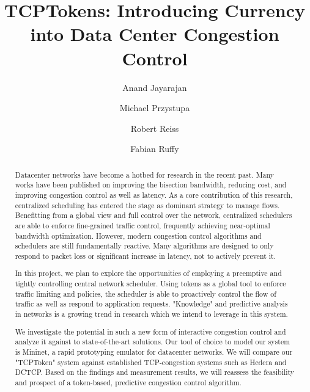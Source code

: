 \documentclass[sigconf]{acmart}
\begin{document}
\title{TCPTokens: Introducing Currency into Data Center Congestion Control}

\author{Anand Jayarajan}

\author{Michael Przystupa}

\author{Robert Reiss}

\author{Fabian Ruffy}

\begin{abstract}
Datacenter networks have become a hotbed for research in the recent past. Many works have been published on improving the bisection bandwidth, reducing cost, and improving congestion control as well as latency. As a core contribution of this research, centralized scheduling has entered the stage as dominant strategy to manage flows. Benefitting from a global view and full control over the network, centralized schedulers are able to enforce fine-grained traffic control, frequently achieving near-optimal bandwidth optimization. However, modern congestion control algorithms and schedulers are still fundamentally reactive. Many algorithms are designed to only respond to packet loss or significant increase in latency, not to actively prevent it.

In this project, we plan to explore the opportunities of employing a preemptive and tightly controlling central network scheduler. Using tokens as a global tool to enforce traffic limiting and policies, the scheduler is able to proactively control the flow of traffic as well as respond to application requests. "Knowledge" and predictive analysis in networks is a growing trend in research which we intend to leverage in this system.

We investigate the potential in such a new form of interactive congestion control and analyze it against to state-of-the-art solutions. Our tool of choice to model our system is Mininet, a rapid prototyping emulator for datacenter networks. We will compare our "TCPToken" system against established TCP-congestion systems such as Hedera and DCTCP. Based on the findings and measurement results, we will reassess the feasibility and prospect of a token-based, predictive congestion control algorithm.
\end{abstract}
\end{document}
